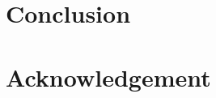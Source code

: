 \documentclass[10pt, a4paper]{article}
\begin{document}
\begin{multicols}{2}
\section{Conclusion}

\section*{Acknowledgement}


%
\end{multicols}
\end{document}
